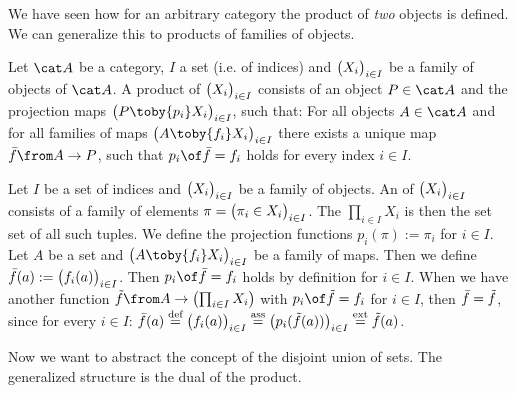 We have seen how for an arbitrary category the product of \emph{two} objects is defined.
We can generalize this to products of families of objects.

\begin{definition}
  \label{def:arb:prod}
  Let $\catA$ be a category, $I$ a set (i.e. of indices) and $\bigl( X_i \bigr)_{i \in I}$ be a family of objects of $\catA$.
  A product of $\bigl( X_i \bigr)_{i \in I}$ consists of an object $P \in \catA$ and the projection maps $\family{P \toby{p_i} X_i}{i \in I}$, such that:
  For all objects $A \in \catA$ and for all families of maps $\family{A \toby{f_i} X_i}{i \in I}$ there exists a unique map $\fbar \from A \to P$, such that $p_i \of \fbar = f_i$ holds for every index $i \in I$.
\end{definition}

\begin{example}
  \label{ex:arb:prod:cart}
  Let $I$ be a set of indices and $\bigl( X_i \bigr)_{i \in I}$ be a family of objects.
  An  of $\bigl( X_i \bigr)_{i \in I}$ consists of a family of elements $\pi = \bigl( \pi_i \in X_i \bigr)_{i \in I}$.
  The  $\prod_{i \in I}{X_i}$ is then the set set of all such tuples.
  We define the projection functions $p_i(\pi) := \pi_i$ for $i \in I$.
  Let $A$ be a set and $\family{A \toby{f_i} X_i}{i \in I}$ be a family of maps.
  Then we define $\bar{f}(a) := \bigl( f_i(a) \bigr)_{i \in I}$.
  Then $p_i \of \fbar = f_i$ holds by definition for $i \in I$.
  When we have another function $\ftilde \from A \to \bigl(\prod_{i \in I}{X_i}\bigr)$ with $p_i \of \ftilde = f_i$ for $i \in I$, then $\bar{f} = \tilde{f}$, since for every $i \in I$:
  $\bar{f}(a) \stackrel{\text{def}}{=} \bigl( f_i(a) \bigr)_{i \in I} \stackrel{\text{ass}}{=} \bigl( p_i(\tilde{f}(a)) \bigr)_{i \in I} \stackrel{\text{ext}}{=} \tilde{f}(a)$.
\end{example}

Now we want to abstract the concept of the disjoint union of sets.
The generalized structure is the dual of the product.

